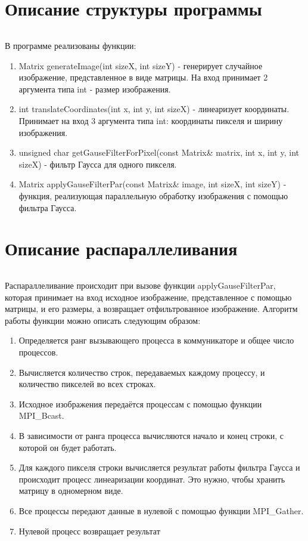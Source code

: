 \documentclass[12pt,a4paper]{article}
\begin{document}
\part*{Описание структуры программы}
\paragraph{}В программе реализованы функции:
\begin{enumerate} 
\item Matrix generateImage(int sizeX, int sizeY) - генерирует случайное изображение, представленное в виде матрицы. На вход принимает 2 аргумента типа int - размер изображения.
\item int translateCoordinates(int x, int y, int sizeX) - линеаризует координаты. Принимает на вход 3 аргумента типа int: координаты пикселя и ширину изображения.
\item unsigned char getGauseFilterForPixel(const Matrix\& matrix, int x, int y, int sizeX) - фильтр Гаусса для одного пикселя. 
\item Matrix applyGauseFilterPar(const Matrix\& image, int sizeX, int sizeY)  - функция, реализующая параллельную обработку изображения с помощью фильтра Гаусса. 
\end{enumerate} 




\part*{Описание распараллеливания}
\paragraph{}Распараллеливание происходит при вызове функции applyGauseFilterPar, которая принимает на вход исходное изображение, представленное с помощью матрицы, и его размеры, а возвращает отфильтрованное изображение. Алгоритм работы функции можно описать следующим образом:
\begin{enumerate} 
\item Определяется ранг вызывающего процесса в коммуникаторе и общее число процессов.
\item Вычисляется количество строк, передаваемых каждому процессу, и количество пикселей во всех строках.
\item Исходное изображения передаётся процессам с помощью функции MPI\_Bcast.
\item В зависимости от ранга процесса вычисляются начало и конец строки, с которой он будет работать.
\item Для каждого пикселя строки вычисляется результат работы фильтра Гаусса и происходит процесс линеаризации координат. Это нужно, чтобы хранить матрицу в одномерном виде.
\item Все процессы передают данные в нулевой с помощью функции MPI\_Gather.
\item Нулевой процесс возвращает результат
\end{enumerate} 
\end{document}
